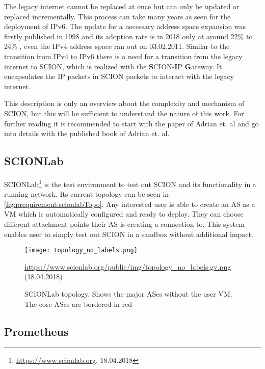 \documentclass[thesis.tex]{subfiles}
\begin{document}
The legacy internet cannot be replaced at once but can only be updated or replaced incrementally. This process can take many years as seen for the deployment of IPv6. The update for a necessary address space expansion was firstly published in 1998\cite{Deering.1998} and its adoption rate is in 2018 only at around 22\% \cite{GoogleInc.} to 24\% \cite{Ripenetworkcoordinationcentre.18.04.2018}, even the IPv4 address space ran out on 03.02.2011\cite{ICANN.03.02.2011}. Similar to the transition from IPv4 to IPv6 there is a need for a transition from the legacy internet to SCION, which is realized with the \textbf{S}CION-\textbf{I}P \textbf{G}ateway. It encapsulates the IP packets in SCION packets to interact with the legacy internet.

This description is only an overview about the complexity and mechanism of SCION, but this will be sufficient to understand the nature of this work. For further reading it is recommended to start with the paper of Adrian et. al\cite{SCIONPaper} and go into details with the published book of Adrian et. al\cite{SCIONBook}.



\subsection{SCIONLab}

SCIONLab\footnote{\url{https://www.scionlab.org}, 18.04.2018} is the test environment to test out SCION and its functionality in a running network. Its current topology can be seen in \autoref{fig:prequirement:scionlabTopo}. Any interested user is able to create an AS as a VM which is automatically configured and ready to deploy. They can choose different attachment points their AS is creating a connection to. This system enables user to simply test out SCION in a sandbox without additional impact.

\begin{figure}
	\centering
	\texttt{[image: topology\_no\_labels.png]}
	\caption*{\tiny{\url{https://www.scionlab.org/public/img/topology_no_labels.gv.png} (18.04.2018)}}
	\caption{SCIONLab topology. Shows the major ASes without the user VM. The core ASes are bordered in red}
	\label{fig:prequirement:scionlabTopo}
\end{figure}

\subsection{Prometheus} 
\end{document}
